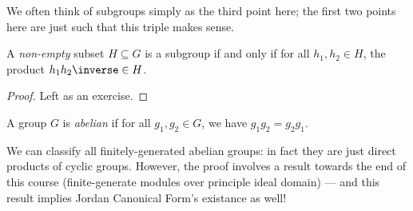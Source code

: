 We often think of subgroups simply as the third point here; the first two points here are just such that this triple makes sense.

\begin{proposition}
    \label{prop:condition-subgroup}%
    A \emph{non-empty} subset \(H \subseteq G\) is a subgroup if and only if for all \(h_1, h_2 \in H\), the product \(h_1 h_2\inverse \in H\).
\end{proposition}

\begin{proof}
    Left as an exercise.
\end{proof}

\begin{definition}
    \label{def:abelian-groups}%
    A group \(G\) is \emph{abelian} if for all \(g_1, g_2 \in G\), we have \(g_1 g_2 = g_2 g_1\).
\end{definition}

We can classify all finitely-generated abelian groups: in fact they are just direct products of cyclic groups. However, the proof involves a result towards the end of this course (finite-generate modules over principle ideal domain) --- and this result implies Jordan Canonical Form's existance as well!

